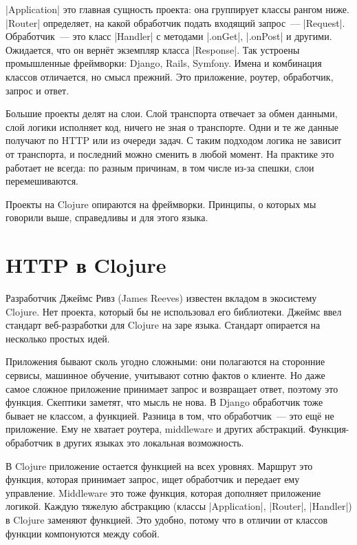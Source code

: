 \spverb|Application| это главная сущность проекта: она группирует классы рангом
ниже. \spverb|Router| определяет, на какой обработчик подать входящий запрос~---
\spverb|Request|. Обработчик~--- это класс \spverb|Handler| с методами
\spverb|.onGet|, \spverb|.onPost| и другими. Ожидается, что он верн\"{е}т экземпляр
класса \spverb|Response|. Так устроены промышленные фреймворки: Django, Rails,
Symfony. Имена и комбинация классов отличается, но смысл прежний. Это
приложение, роутер, обработчик, запрос и ответ.


Большие проекты делят на слои. Слой транспорта отвечает за обмен данными, слой
логики исполняет код, ничего не зная о транспорте. Одни и те же данные получают
по HTTP или из очереди задач. С таким подходом логика не зависит от транспорта,
и последний можно сменить в любой момент. На практике это работает не всегда: по
разным причинам, в том числе из-за спешки, слои перемешиваются.

Проекты на Clojure опираются на фреймворки. Принципы, о которых мы говорили
выше, справедливы и для этого языка.

\section{HTTP в Clojure}


Разработчик Джеймс Ривз (James Reeves)
известен вкладом в экосистему Clojure. Нет проекта, который бы не использовал
его библиотеки. Джеймс ввел стандарт веб-разработки для Clojure на заре
языка. Стандарт опирается на несколько простых идей.

Приложения бывают сколь угодно сложными: они полагаются на сторонние сервисы,
машинное обучение, учитывают сотню фактов о клиенте. Но даже самое сложное
приложение принимает запрос и возвращает ответ, поэтому это функция. Скептики
заметят, что мысль не нова. В Django обработчик тоже бывает не классом, а
функцией. Разница в том, что обработчик~--- это ещ\"{е} не приложение. Ему не
хватает роутера, middleware и других абстракций. Функция-обработчик в других
языках это локальная возможность.

\label{http-all-function}

В Clojure приложение остается функцией на всех уровнях. Маршрут это функция,
которая принимает запрос, ищет обработчик и передает ему управление. Middleware
это тоже функция, которая дополняет приложение логикой. Каждую тяжелую
абстракцию (классы \spverb|Application|, \spverb|Router|, \spverb|Handler|) в
Clojure заменяют функцией. Это удобно, потому что в отличии от классов функции
компонуются между собой.

